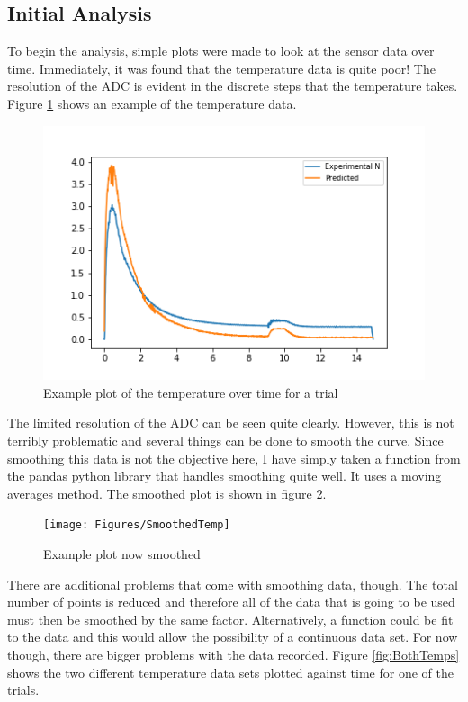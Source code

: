 \subsection{Initial Analysis}
To begin the analysis, simple plots were made to look at the sensor data over time. Immediately, it was found that the temperature data is quite poor! The resolution of the ADC is evident in the discrete steps that the temperature takes. Figure \ref{fig:BadTemp} shows an example of the temperature data.
\begin{figure}[h!]
\centering
\includegraphics[scale=.5]{Figures/ExampleTemp}
\caption{Example plot of the temperature over time for a trial}
\label{fig:BadTemp}
\end{figure}
The limited resolution of the ADC can be seen quite clearly. However, this is not terribly problematic and several things can be done to smooth the curve. Since smoothing this data is not the objective here, I have simply taken a function from the pandas python library that handles smoothing quite well. It uses a moving averages method. The smoothed plot is shown in figure \ref{fig:SmoothedTemp}.
\begin{figure}[h!]
\centering
\texttt{[image: Figures/SmoothedTemp]}
\caption{Example plot now smoothed}
\label{fig:SmoothedTemp}
\end{figure}
There are additional problems that come with smoothing data, though. The total number of points is reduced and therefore all of the data that is going to be used must then be smoothed by the same factor. Alternatively, a function could be fit to the data and this would allow the possibility of a continuous data set. For now though, there are bigger problems with the data recorded. Figure \ref{fig:BothTemps} shows the two different temperature data sets plotted against time for one of the trials. 
